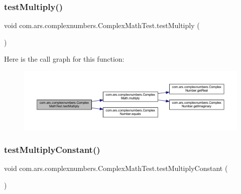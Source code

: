 \subsubsection{\texorpdfstring{test\+Multiply()}{testMultiply()}}
{\footnotesize\ttfamily void com.\+ars.\+complexnumbers.\+Complex\+Math\+Test.\+test\+Multiply (\begin{DoxyParamCaption}{ }\end{DoxyParamCaption})}

Here is the call graph for this function\+:\nopagebreak
\begin{figure}[H]
\begin{center}
\leavevmode
\includegraphics[width=350pt]{classcom_1_1ars_1_1complexnumbers_1_1_complex_math_test_a195e4c9c2b94ada809ff5ca462a9dc06_cgraph}
\end{center}
\end{figure}
\hypertarget{classcom_1_1ars_1_1complexnumbers_1_1_complex_math_test_a118231be2a26c23d165d3b40093352ac}{}\label{classcom_1_1ars_1_1complexnumbers_1_1_complex_math_test_a118231be2a26c23d165d3b40093352ac} 
\subsubsection{\texorpdfstring{test\+Multiply\+Constant()}{testMultiplyConstant()}}
{\footnotesize\ttfamily void com.\+ars.\+complexnumbers.\+Complex\+Math\+Test.\+test\+Multiply\+Constant (\begin{DoxyParamCaption}{ }\end{DoxyParamCaption})}

